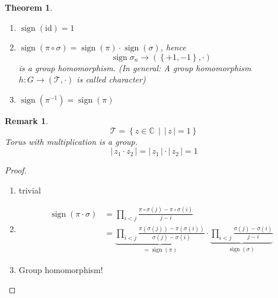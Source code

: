 \documentclass[a4paper,landscape,twocolumn]{article}
\newcommand\abs[1]{|\,#1\,|}
\newcommand\set[1]{\left\{#1\right\}}
\newcommand\setdef[2]{\left\{#1\,\middle|\,#2\right\}}
\newtheorem{theorem}{Theorem}
\newtheorem{rem}{Remark}
\DeclareMathOperator\sign{sign}
\begin{document}
\begin{theorem}
  \begin{enumerate}
    \item $\sign(\text{id}) = 1$
    \item $\sign(\pi \circ \sigma) = \sign(\pi) \cdot \sign(\sigma)$, hence
      \[ \sign{\sigma_n} \to (\set{+1, -1}, \cdot) \]
      is a group homomorphism.
      (In general: A group homomorphism $h: G \to (\mathcal T, \cdot)$ is called \emph{character})
    \item $\sign(\pi^{-1}) = \sign(\pi)$
  \end{enumerate}
\end{theorem}
\begin{rem}
  \[ \mathcal T = \setdef{z \in \mathbb C}{\abs{z} = 1} \]
  Torus with multiplication is a group.
  \[ \abs{z_1 \cdot z_2} = \abs{z_1} \cdot \abs{z_2} = 1 \]
\end{rem}
\begin{proof}
  \begin{enumerate}
    \item trivial
    \item
      \begin{align*}
        \sign(\pi \cdot \sigma) &= \prod_{i<j} \frac{\pi \circ \sigma(j) - \pi \circ \sigma(i)}{j - i} \\
          &= \underbrace{\prod_{i<j} \frac{\pi(\sigma(j)) - \pi(\sigma(i))}{\sigma(j) - \sigma(i)}}_{=\sign(\pi)}
             \cdot \underbrace{\prod_{i < j} \frac{\sigma(j) - \sigma(i)}{j - i}}_{\sign(\sigma)}
      \end{align*}
    \item Group homomorphism!
  \end{enumerate}
\end{proof}
\end{document}
